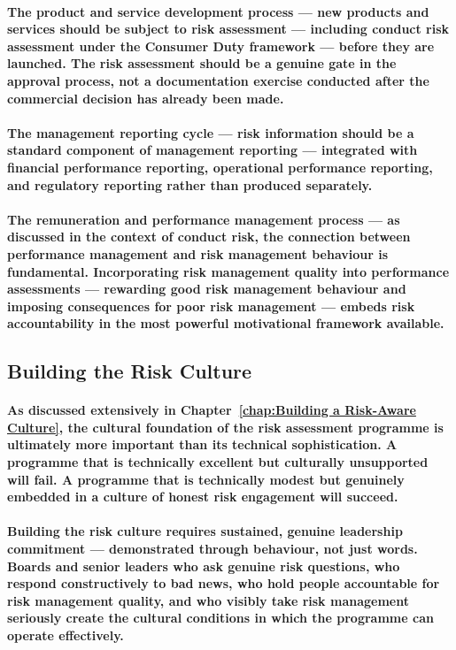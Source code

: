 \paragraph{\textbf{The product and service development process} — new products and services should be subject to risk assessment — including conduct risk assessment under the Consumer Duty framework — before they are launched. The risk assessment should be a genuine gate in the approval process, not a documentation exercise conducted after the commercial decision has already been made.}
\paragraph{\textbf{The management reporting cycle} — risk information should be a standard component of management reporting — integrated with financial performance reporting, operational performance reporting, and regulatory reporting rather than produced separately.}
\paragraph{\textbf{The remuneration and performance management process} — as discussed in the context of conduct risk, the connection between performance management and risk management behaviour is fundamental. Incorporating risk management quality into performance assessments — rewarding good risk management behaviour and imposing consequences for poor risk management — embeds risk accountability in the most powerful motivational framework available.}

\subsection{Building the Risk Culture}
\paragraph{As discussed extensively in Chapter~\ref{chap:Building a Risk-Aware Culture}, the cultural foundation of the risk assessment programme is ultimately more important than its technical sophistication. A programme that is technically excellent but culturally unsupported will fail. A programme that is technically modest but genuinely embedded in a culture of honest risk engagement will succeed.}
\paragraph{Building the risk culture requires sustained, genuine leadership commitment — demonstrated through behaviour, not just words. Boards and senior leaders who ask genuine risk questions, who respond constructively to bad news, who hold people accountable for risk management quality, and who visibly take risk management seriously create the cultural conditions in which the programme can operate effectively.}
